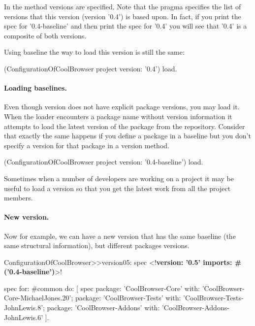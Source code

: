 \documentclass[a4paper,10pt,twoside]{book}
\begin{document}
In the method  versions are specified. Note that the pragma  specifies the list of versions that this version (version '0.4') is based upon. In fact, if you print the spec for '0.4-baseline' and then print the spec for '0.4' you will see that '0.4' is a composite of both versions.

Using baseline the way to load this version is still the same:
\begin{code}{}
(ConfigurationOfCoolBrowser project version: '0.4') load.
\end{code}


\paragraph{Loading baselines.}
Even though version  does not have explicit package versions, you may load it. When the loader encounters a package name without version information it attempts to load the latest version of the package from the repository. Consider that exactly the same happens if you define a package in a baseline but you don't specify a version for that package in a version method. 
 
\begin{code}{}
(ConfigurationOfCoolBrowser project version: '0.4-baseline') load.
\end{code}

Sometimes when a number of developers are working on a project it may be useful to load a  version so that you get the latest work from all the project members.


\paragraph{New version.}
Now for example, we can have a new version  that has the same baseline (the same structural information), but different packages versions. 

\begin{code}{} 
ConfigurationOfCoolBrowser>>version05: spec 
	<!\textbf{version: '0.5' imports: \#('0.4-baseline')}>!
	
	spec for: #common do: [
		spec 
			package: 'CoolBrowser-Core' with: 'CoolBrowser-Core-MichaelJones.20';
			package: 'CoolBrowser-Tests' with: 'CoolBrowser-Tests-JohnLewis.8';
			package: 'CoolBrowser-Addons' with: 'CoolBrowser-Addons-JohnLewis.6' ].
\end{code}
\end{document}
